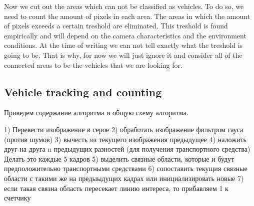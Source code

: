 \documentclass[12pt,a4paper,oneside,titlepage]{article}
\begin{document}
Now we cut out the areas which can not be classified as vehicles.
To do so, we need to count the amount of pixels in each area. The areas in which the amount of pixels exceeds a certain treshold are eliminated.
This treshold is found empirically and will depend on the camera characteristics and the environment conditions.
At the time of writing we can not tell exactly what the treshold is going to be.
That is why, for now we will just ignore it and consider all of the connected areas to be the vehicles that we are looking for. 








\subsection{Vehicle tracking and counting}









Приведем содержание алгоритма и общую схему алгоритма.

1) Перевести изображение в серое
2) обработать изображение фильтром гауса (против шумов)
3) вычесть из текущего изображения предыдущее
4) наложить друг на друга n предыдущих разностей (для получения транспортного средства) Делать это каждые 5 кадров
5) выделить связные области, которые и будут предположительно транспортными средствами 
6) сопоставить текущия связные области с такими же на предыыдущих кадрах или инициализировать новые
7) если такая связна область пересекает линию интереса, то прибавляем 1 к счетчику
\end{document}
